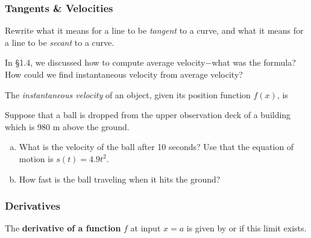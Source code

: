\documentclass[notes]{subfiles}
\begin{document}
			\newpage
		
	\subsubsection*{Tangents \& Velocities}
		\begin{question}
			Rewrite what it means for a line to be \emph{tangent} to a curve, and what it means for a line to be \emph{secant} to a curve.
		\end{question}
				
		\begin{question}
			In \S1.4, we discussed how to compute average velocity$-$what was the formula?  How could we find instantaneous velocity from average velocity?
		\end{question}
			
		\begin{rmk}
			The \emph{instantaneous velocity} of an object, given its position function $f(x)$, is
		\end{rmk}
		\begin{ex}
			Suppose that a ball is dropped from the upper observation deck of a building which is 980 m above the ground.
			\begin{enumerate}[(a)]
				\item What is the velocity of the ball after 10 seconds?  Use that the equation of motion is $s(t) = 4.9t^2$.
				\item How fast is the ball traveling when it hits the ground?
			\end{enumerate}
		\end{ex}
			\newpage
	\subsubsection*{Derivatives}
		\begin{defn}[The Derivative (at $x = a$)]
			The \textbf{derivative of a function} $f$ at input $x = a$ is given by
			or
			if this limit exists.
		\end{defn}
			
\end{document}
